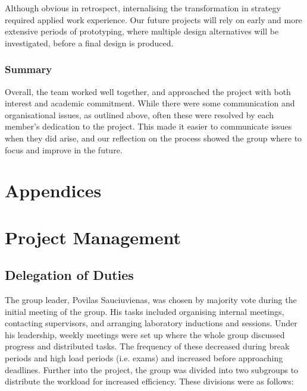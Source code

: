\documentclass[letterpaper,12pt]{article}
\begin{document}
Although obvious in retrospect, internalising the transformation in strategy required applied work experience. Our future projects will rely on early and more extensive periods of prototyping, where multiple design alternatives will be investigated, before a final design is produced.   

\subsubsection{Summary } 

Overall, the team worked well together, and approached the project with both interest and academic commitment. While there were some communication and organisational issues, as outlined above, often these were resolved by each member’s dedication to the project. This made it easier to communicate issues when they did arise, and our reflection on the process showed the group where to focus and improve in the future. 

\newpage
{}

\printbibliography[title=References]

\newpage


\section*{Appendices}

\appendix
\addappheadtotoc

\section{Project Management}
\subsection{Delegation of Duties}

The group leader, Povilas Sauciuvienas, was chosen by majority vote during the initial meeting of the group. His tasks included organising internal meetings, contacting supervisors, and arranging laboratory inductions and sessions. 
Under his leadership, weekly meetings were set up where the whole group discussed progress and distributed tasks. The frequency of these decreased during break periods and high load periods (i.e. exams) and increased before approaching deadlines.  
Further into the project, the group was divided into two subgroups to distribute the workload for increased efficiency. These divisions were as follows: 
\end{document}
